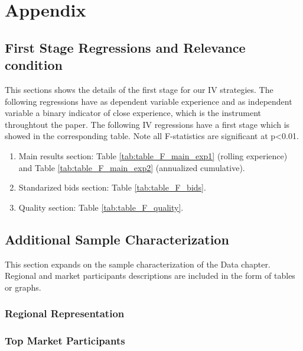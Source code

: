 \chapter{Appendix}

\section{First Stage Regressions and Relevance condition}
\label{section:appendix_rank}
This sections shows the details of the first stage for our IV strategies. The following regressions have as dependent variable experience and as independent variable a binary indicator of close experience, which is the instrument throughtout the paper. The following IV regressions have a first stage which is showed in the corresponding table. Note all F-statistics are significant at p<0.01.

\begin{enumerate}
  \item Main results section: Table \ref{tab:table_F_main_exp1} (rolling experience) and Table \ref{tab:table_F_main_exp2} (annualized cumulative).
  \item Standarized bids section: Table \ref{tab:table_F_bids}.
  \item Quality section: Table \ref{tab:table_F_quality}.
\end{enumerate}











\clearpage
\section{Additional Sample Characterization}
This section expands on the sample characterization of the Data chapter. Regional and market participants descriptions are included in the form of tables or graphs.

\subsection{Regional Representation}

\clearpage

\subsection{Top Market Participants}

\small




